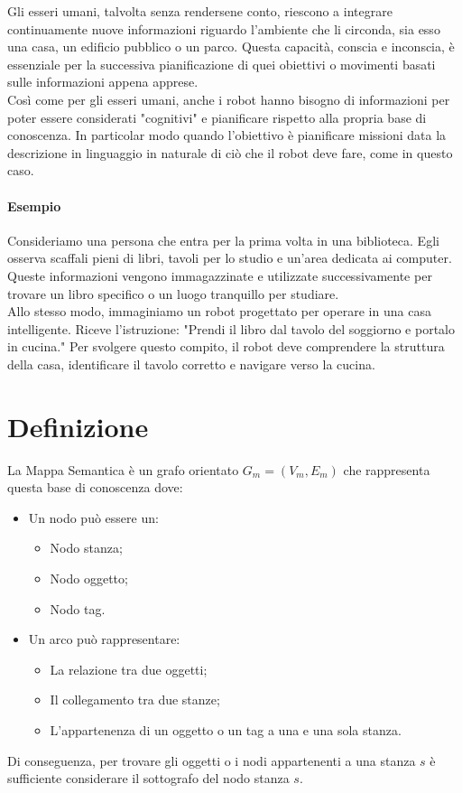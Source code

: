 Gli esseri umani, talvolta senza rendersene conto, riescono a integrare continuamente nuove informazioni riguardo l'ambiente che li circonda, sia esso una casa, un edificio pubblico o un parco. Questa capacità, conscia e inconscia, è essenziale per la successiva pianificazione di quei obiettivi o movimenti basati sulle informazioni appena apprese. \\
Così come per gli esseri umani, anche i robot hanno bisogno di informazioni per poter essere considerati "cognitivi" e pianificare rispetto alla propria base di conoscenza. In particolar modo quando l'obiettivo è pianificare missioni data la descrizione in linguaggio in naturale di ciò che il robot deve fare, come in questo caso.

\paragraph*{Esempio}
Consideriamo una persona che entra per la prima volta in una biblioteca. Egli osserva scaffali pieni di libri, tavoli per lo studio e un'area dedicata ai computer. Queste informazioni vengono immagazzinate e utilizzate successivamente per trovare un libro specifico o un luogo tranquillo per studiare.\\
Allo stesso modo, immaginiamo un robot progettato per operare in una casa intelligente. Riceve l'istruzione: "Prendi il libro dal tavolo del soggiorno e portalo in cucina." Per svolgere questo compito, il robot deve comprendere la struttura della casa, identificare il tavolo corretto e navigare verso la cucina.

\section{Definizione}
La Mappa Semantica è un grafo orientato $G_m = (V_m, E_m)$ che rappresenta questa base di conoscenza dove:
\begin{itemize}
  \item Un nodo può essere un:
        \begin{itemize}
          \item Nodo stanza;
          \item Nodo oggetto;
          \item Nodo tag.
        \end{itemize}
  \item Un arco può rappresentare:
        \begin{itemize}
          \item La relazione tra due oggetti;
          \item Il collegamento tra due stanze;
          \item L'appartenenza di un oggetto o un tag a una e una sola stanza.
        \end{itemize}
\end{itemize}
Di conseguenza, per trovare gli oggetti o i nodi appartenenti a una stanza $s$ è sufficiente considerare il sottografo del nodo stanza $s$.

